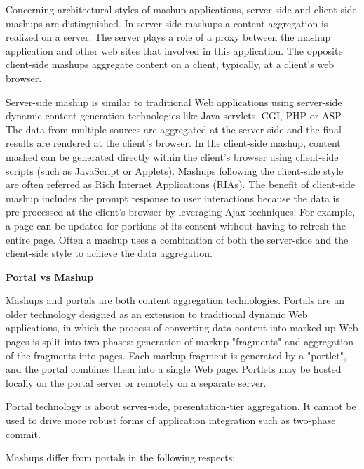 		Concerning architectural styles of mashup applications, server-side and client-side mashups are distinguished. In server-side mashups a content aggregation is realized on a server\cite{mashA}. The server plays a role of a proxy between the mashup application and other web sites that involved in this application. The opposite client-side mashups aggregate content on a client, typically, at a client's web browser\cite{mashB}.

	 Server-side mashup is similar to traditional Web applications using server-side dynamic content generation technologies like Java servlets, CGI, PHP or ASP. The data from multiple sources are aggregated at the server side and the final results are rendered at the client’s browser. In the client-side mashup, content mashed can be generated directly within the client’s browser using client-side scripts (such as JavaScript or Applets). Mashups following the client-side style are often referred as Rich Internet Applications (RIAs). The benefit of client-side mashup includes the prompt response to user interactions because the data is pre-processed at the client’s browser by leveraging Ajax techniques. For example, a page can be updated for portions of its content without having to refresh the entire page. Often a mashup uses a combination of both the server-side and the client-side style to achieve the data aggregation\cite{bolin2005end}.

        \textbf{Portal vs Mashup}

		Mashups and portals are both content aggregation technologies. Portals are an older technology designed as an extension to traditional dynamic Web applications, in which the process of converting data content into marked-up Web pages is split into two phases: generation of markup "fragments" and aggregation of the fragments into pages. Each markup fragment is generated by a "portlet", and the portal combines them into a single Web page. Portlets may be hosted locally on the portal server or remotely on a separate server.

		Portal technology is about server-side, presentation-tier aggregation. It cannot be used to drive more robust forms of application integration such as two-phase commit.

		Mashups differ from portals in the following respects:

